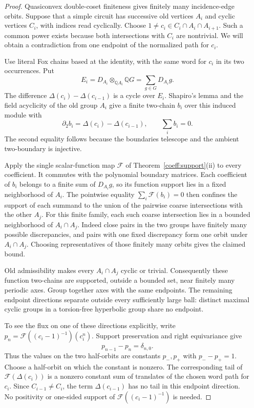 \begin{proof}
Quasiconvex double-coset finiteness gives finitely many incidence-edge
orbits. Suppose that a simple circuit has successive old vertices
$A_i$ and cyclic vertices $C_i$, with indices read cyclically. Choose
$1\ne c_i\in C_i\cap A_i\cap A_{i+1}$. Such a common power exists
because both intersections with $C_i$ are nontrivial. We will obtain a
contradiction from one endpoint of the normalized path for $c_i$.

Use literal Fox chains based at the identity, with the same word for
$c_i$ in its two occurrences. Put
\[
 E_i=D_{A_i}\otimes_{\mathbb QA_i}\mathbb QG
       =\sum_{g\in G}D_{A_i}g.
\]
The difference $\Delta(c_i)-\Delta(c_{i-1})$ is a cycle over $E_i$.
Shapiro's lemma and the field acyclicity of the old group $A_i$ give
a finite two-chain $b_i$ over this induced module with
\[
 \partial_2 b_i=\Delta(c_i)-\Delta(c_{i-1}),
 \qquad \sum_i b_i=0.
\]
The second equality follows because the boundaries telescope and
the ambient two-boundary is injective.

Apply the single scalar-function map $\mathcal F$ of
Theorem~\ref{coeff:support}(ii) to every coefficient. It commutes with
the polynomial boundary matrices. Each coefficient of $b_i$ belongs
to a finite sum of $D_{A_i}g$, so its function support lies in a fixed
neighborhood of $A_i$. The pointwise equality $\sum_i\mathcal F(b_i)=0$
then confines the support of each summand to the union of the pairwise
coarse intersections with the other $A_j$. For this finite family,
each such coarse intersection lies in a bounded neighborhood of
$A_i\cap A_j$. Indeed close pairs in the two groups have finitely
many possible discrepancies, and pairs with one fixed discrepancy
form one orbit under $A_i\cap A_j$. Choosing representatives of
those finitely many orbits gives the claimed bound.

Old admissibility makes every $A_i\cap A_j$ cyclic or trivial.
Consequently these function two-chains are supported, outside a
bounded set, near finitely many periodic axes. Group together axes
with the same endpoints. The remaining endpoint directions separate
outside every sufficiently large ball: distinct maximal cyclic groups
in a torsion-free hyperbolic group share no endpoint.

To see the flux on one of these directions explicitly, write
$p_n=\mathcal F((c_i-1)^{-1})(c_i^n)$. Support preservation and right
equivariance give
\[
 p_{n-1}-p_n=\delta_{n,0}.
\]
Thus the values on the two half-orbits are constants $p_-,p_+$ with
$p_--p_+=1$. Choose a half-orbit on which the constant is nonzero.
The corresponding tail of $\mathcal F(\Delta(c_i))$ is a nonzero
constant sum of translates of the chosen word path for $c_i$.
Since $C_{i-1}\ne C_i$, the term $\Delta(c_{i-1})$ has no tail in
this endpoint direction. No positivity or one-sided support of
$\mathcal F((c_i-1)^{-1})$ is needed.


\end{proof}
